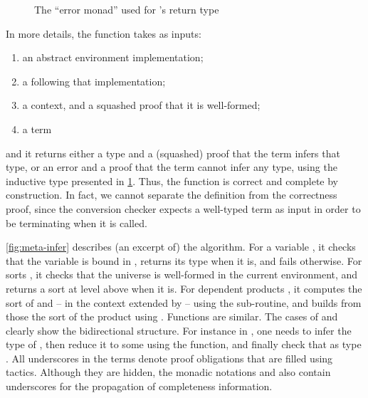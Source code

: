 \begin{figure}[h]
  \caption{The “error monad” used for ’s return type}
  \label{fig:meta-error-mon}
\end{figure}

In more details, the function takes as inputs:
\begin{enumerate}
  \item an abstract environment implementation;
  \item a  following that implementation;
  \item a context, and a squashed proof that it is well-formed;
  \item a term
\end{enumerate}
and it returns either a type and a (squashed) proof that the term infers that type, or
an error and a proof that the term cannot infer any type, using the inductive type presented in
\cref{fig:meta-error-mon}.
Thus, the function is correct and complete by construction.
In fact, we cannot separate
the definition from the correctness proof, since the conversion checker
expects a well-typed term as input in order to be terminating when it is called.

\begin{figure*}
  \caption{Definition of  (excerpt)}
  \label{fig:meta-infer}
\end{figure*}

\cref{fig:meta-infer} describes (an excerpt of) the algorithm.
%
For a variable , it checks that the variable is bound in
, returns its type when it is, and fails otherwise.
%
For sorts , it checks that the universe is well-formed in the current
environment, and returns a sort at level above when it is.
%
For dependent products , it computes the sort of
 and  – in the context extended by
–  using the  sub-routine,%
and builds from those the sort of the product using .
Functions are similar.
%
The cases of  and  clearly show the bidirectional
structure. For instance in
, one needs to infer the type  of ,
then reduce it to some  using the
 function, and finally check that  as
type .
%
All underscores \coqe{_} in the terms denote proof obligations that are filled using
tactics. Although they are hidden, the monadic notations \coqe{;;}
and  also contain underscores for the propagation of completeness
information.%

